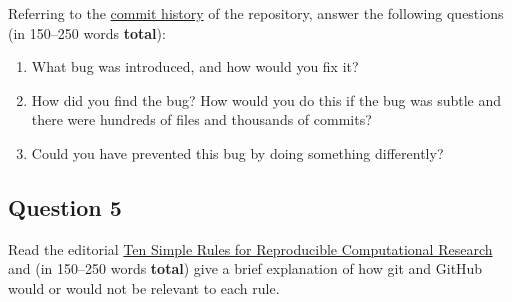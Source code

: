 \documentclass[11pt,onecolumn]{scrartcl}
\begin{document}
Referring to the \href{https://github.com/aezarebski/biology-github-tutorial/commits/main}{commit history} of the repository, answer the following
questions (in 150--250 words \textbf{total}):

\begin{enumerate}
\item What bug was introduced, and how would you fix it?
\item How did you find the bug? How would you do this if the bug was subtle and
there were hundreds of files and thousands of commits?
\item Could you have prevented this bug by doing something differently?
\end{enumerate}

\subsection{Question 5}
\label{sec:org1f578d4}

Read the editorial \href{https://doi.org/10.1371/journal.pcbi.1003285}{Ten Simple Rules for Reproducible Computational Research} and
(in 150--250 words \textbf{total}) give a brief explanation of how git and GitHub would
or would not be relevant to each rule.
\end{document}
